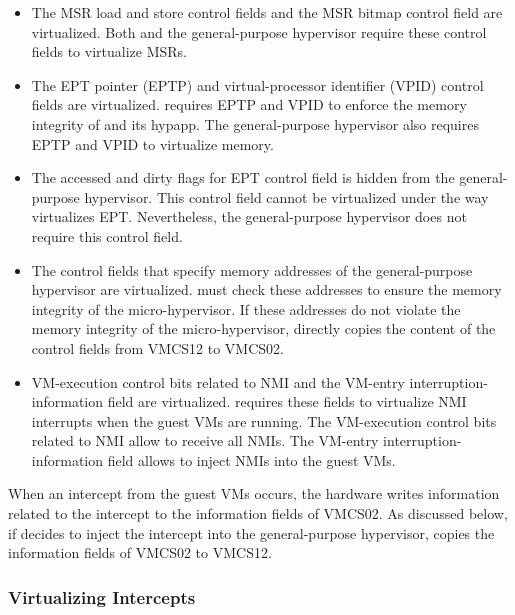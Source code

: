 \begin{itemize}
\item The MSR load and store control fields and the MSR bitmap control field are virtualized. Both  and the general-purpose hypervisor require these control fields to virtualize MSRs.

\item The EPT pointer (EPTP) and virtual-processor identifier (VPID) control fields are virtualized.  requires EPTP and VPID to enforce the memory integrity of  and its hypapp. The general-purpose hypervisor also requires EPTP and VPID to virtualize memory.

\item The accessed and dirty flags for EPT control field is hidden from the general-purpose hypervisor. This control field cannot be virtualized under the way  virtualizes EPT. Nevertheless, the general-purpose hypervisor does not require this control field.

\item The control fields that specify memory addresses of the general-purpose hypervisor are virtualized.  must check these addresses to ensure the memory integrity of the micro-hypervisor. If these addresses do not violate the memory integrity of the micro-hypervisor,  directly copies the content of the control fields from VMCS12 to VMCS02.

\item VM-execution control bits related to NMI and the VM-entry interruption-information field are virtualized.  requires these fields to virtualize NMI interrupts when the guest VMs are running. The VM-execution control bits related to NMI allow  to receive all NMIs. The VM-entry interruption-information field allows  to inject NMIs into the guest VMs.

\end{itemize}

When an intercept from the guest VMs occurs, the hardware writes information related to the intercept to the information fields of VMCS02. As discussed below, if  decides to inject the intercept into the general-purpose hypervisor,  copies the information fields of VMCS02 to VMCS12.

\subsubsection{Virtualizing Intercepts}

